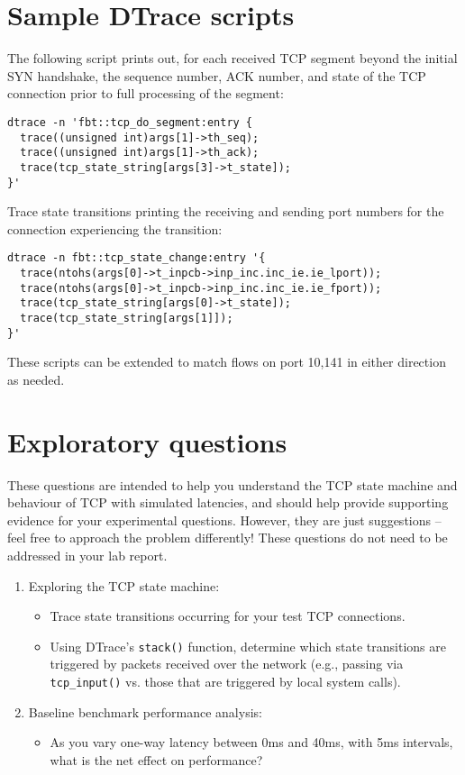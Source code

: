 \documentclass[a4paper,10pt]{article}
\begin{document}
\section*{Sample DTrace scripts}

The following script prints out, for each received TCP segment beyond the
initial SYN handshake, the sequence number, ACK number, and state of the TCP
connection prior to full processing of the segment:

\begin{verbatim}
dtrace -n 'fbt::tcp_do_segment:entry {
  trace((unsigned int)args[1]->th_seq);
  trace((unsigned int)args[1]->th_ack);
  trace(tcp_state_string[args[3]->t_state]);
}'
\end{verbatim}

\noindent
Trace state transitions printing the receiving and sending port numbers for
the connection experiencing the transition:

\begin{verbatim}
dtrace -n fbt::tcp_state_change:entry '{
  trace(ntohs(args[0]->t_inpcb->inp_inc.inc_ie.ie_lport));
  trace(ntohs(args[0]->t_inpcb->inp_inc.inc_ie.ie_fport));
  trace(tcp_state_string[args[0]->t_state]);
  trace(tcp_state_string[args[1]]);
}'
\end{verbatim}

\noindent
These scripts can be extended to match flows on port 10,141 in either
direction as needed.

\section*{Exploratory questions}

These questions are intended to help you understand the TCP state machine and
behaviour of TCP with simulated latencies, and should help provide supporting
evidence for your experimental questions.
However, they are just suggestions -- feel free to approach the problem
differently!
These questions do not need to be addressed in your lab report.

\begin{enumerate}
  \item Exploring the TCP state machine:
  \begin{itemize}
    \item Trace state transitions occurring for your test TCP connections.
    \item Using DTrace's \texttt{stack()} function, determine which state
      transitions are triggered by packets received over the network (e.g.,
      passing via \texttt{tcp\_input()} vs. those that are triggered by local
      system calls).
  \end{itemize}
  \item Baseline benchmark performance analysis:
  \begin{itemize}
    \item As you vary one-way latency between 0ms and 40ms, with 5ms
      intervals, what is the net effect on performance?
  \end{itemize}
\end{enumerate}
\end{document}
